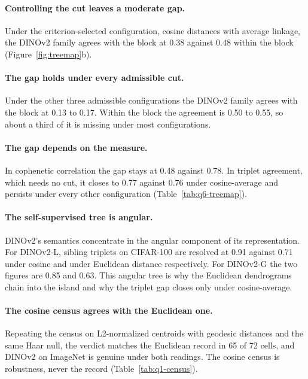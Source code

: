 \documentclass{article}
\theoremstyle{definition}
\theoremstyle{plain}
\theoremstyle{remark}
\begin{document}
\paragraph{Controlling the cut leaves a moderate gap.} Under the criterion-selected configuration, cosine distances with average linkage, the DINOv2 family agrees with the block at 0.38 against 0.48 within the block (Figure~\ref{fig:treemap}b). %

\paragraph{The gap holds under every admissible cut.} Under the other three admissible configurations the DINOv2 family agrees with the block at 0.13 to 0.17. Within the block the agreement is 0.50 to 0.55, so about a third of it is missing under most configurations. %

\paragraph{The gap depends on the measure.} In cophenetic correlation the gap stays at 0.48 against 0.78. In triplet agreement, which needs no cut, it closes to 0.77 against 0.76 under cosine-average and persists under every other configuration (Table~\ref{tab:q6-treemap}). %

\paragraph{The self-supervised tree is angular.} DINOv2's semantics concentrate in the angular component of its representation. For DINOv2-L, sibling triplets on CIFAR-100 are resolved at 0.91 against 0.71 under cosine and under Euclidean distance respectively. For DINOv2-G the two figures are 0.85 and 0.63. This angular tree is why the Euclidean dendrograms chain into the island and why the triplet gap closes only under cosine-average. %

\paragraph{The cosine census agrees with the Euclidean one.} Repeating the census on L2-normalized centroids with geodesic distances and the same Haar null, the verdict matches the Euclidean record in 65 of 72 cells, and DINOv2 on ImageNet is genuine under both readings. The cosine census is robustness, never the record (Table~\ref{tab:q1-census}). %
\end{document}
